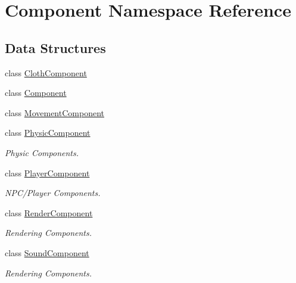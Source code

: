 \hypertarget{namespace_component}{}\section{Component Namespace Reference}
\label{namespace_component}
\subsection*{Data Structures}
\begin{DoxyCompactItemize}
\item 
class \hyperlink{class_component_1_1_cloth_component}{Cloth\+Component}
\item 
class \hyperlink{class_component_1_1_component}{Component}
\item 
class \hyperlink{class_component_1_1_movement_component}{Movement\+Component}
\item 
class \hyperlink{class_component_1_1_physic_component}{Physic\+Component}
\begin{DoxyCompactList}\small\item\em Physic Components. \end{DoxyCompactList}\item 
class \hyperlink{class_component_1_1_player_component}{Player\+Component}
\begin{DoxyCompactList}\small\item\em N\+P\+C/\+Player Components. \end{DoxyCompactList}\item 
class \hyperlink{class_component_1_1_render_component}{Render\+Component}
\begin{DoxyCompactList}\small\item\em Rendering Components. \end{DoxyCompactList}\item 
class \hyperlink{class_component_1_1_sound_component}{Sound\+Component}
\begin{DoxyCompactList}\small\item\em Rendering Components. \end{DoxyCompactList}\end{DoxyCompactItemize}
